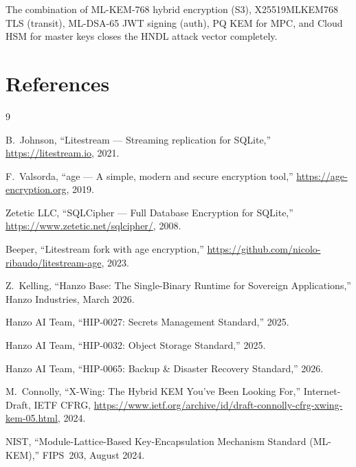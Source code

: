 \documentclass[11pt]{article}
\begin{document}
The combination of ML-KEM-768 hybrid encryption (S3), X25519MLKEM768
TLS (transit), ML-DSA-65 JWT signing (auth), PQ KEM for MPC, and
Cloud HSM for master keys closes the HNDL attack vector completely.

\section{References}

\begin{thebibliography}{9}

B.~Johnson, ``Litestream --- Streaming replication for SQLite,''
\url{https://litestream.io}, 2021.

F.~Valsorda, ``age --- A simple, modern and secure encryption tool,''
\url{https://age-encryption.org}, 2019.

Zetetic LLC, ``SQLCipher --- Full Database Encryption for SQLite,''
\url{https://www.zetetic.net/sqlcipher/}, 2008.

Beeper, ``Litestream fork with age encryption,''
\url{https://github.com/nicolo-ribaudo/litestream-age}, 2023.

Z.~Kelling, ``Hanzo Base: The Single-Binary Runtime for Sovereign
Applications,'' Hanzo Industries, March 2026.

Hanzo AI Team, ``HIP-0027: Secrets Management Standard,'' 2025.

Hanzo AI Team, ``HIP-0032: Object Storage Standard,'' 2025.

Hanzo AI Team, ``HIP-0065: Backup \& Disaster Recovery Standard,'' 2026.

M.~Connolly, ``X-Wing: The Hybrid KEM You've Been Looking For,''
Internet-Draft, IETF CFRG,
\url{https://www.ietf.org/archive/id/draft-connolly-cfrg-xwing-kem-05.html},
2024.

NIST, ``Module-Lattice-Based Key-Encapsulation Mechanism Standard
(ML-KEM),'' FIPS~203, August 2024.

\end{thebibliography}
\end{document}
